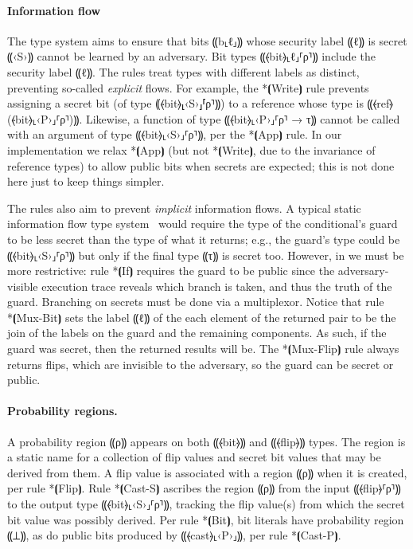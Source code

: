 \paragraph*{Information flow}
%
The type system aims to ensure that bits ⸨b⸤ℓ⸥⸩ whose security label
⸨ℓ⸩ is secret ⸨‹S›⸩ cannot be learned by an adversary. Bit types
⸨⦑bit⦒⸤ℓ⸥⸢ρ⸣⸩ include the security label ⸨ℓ⸩. The rules treat types
with different labels as distinct, preventing so-called \emph{explicit} flows. For
example, the *⦗Write⦘ rule prevents assigning a secret bit (of type
⸨⦑bit⦒⸤‹S›⸥⸢ρ⸣⸩) to a reference whose type is
⸨⦑ref⦒(⦑bit⦒⸤‹P›⸥⸢ρ⸣)⸩. Likewise, a function of type ⸨⦑bit⦒⸤‹P›⸥⸢ρ⸣ →
τ⸩ cannot be called with an argument of type ⸨⦑bit⦒⸤‹S›⸥⸢ρ⸣⸩, per the
*⦗App⦘ rule. In our implementation we relax *⦗App⦘ (but not *⦗Write⦘, due to
the invariance of reference types) to allow public bits
when secrets are expected; this is not done here just to keep things simpler.

The rules also aim to prevent \emph{implicit} information flows. A
typical static information flow type system~\cite{infoflow} would
require the type of the conditional's guard
to be less secret than the type of what it returns; e.g., the guard's
type could be ⸨⦑bit⦒⸤‹S›⸥⸢ρ⸣⸩ but only if the final type ⸨τ⸩ is secret
too. However, in \obliv we must be more restrictive: rule *⦗If⦘
requires the guard to be public since the
adversary-visible execution trace reveals which branch is taken, and
thus the truth of the guard. Branching on secrets must be done via
a multiplexor. Notice that rule *⦗Mux-Bit⦘ sets the label ⸨ℓ⸩ of the
each element of the returned pair to be the join of the labels on the
guard and the remaining components. As such, if the guard was secret,
then the returned results will be.  The *⦗Mux-Flip⦘ rule
always returns flips, which are invisible to the adversary, so the
guard can be secret or public.

\paragraph*{Probability regions.}
%
A probability region ⸨ρ⸩ appears on both ⸨⦑bit⦒⸩ and ⸨⦑flip⦒⸩
types. The region is a static name for a collection of flip values and
secret bit values that may be derived from them. A flip value is
associated with a region ⸨ρ⸩ when it is created, per rule *⦗Flip⦘. Rule
*⦗Cast-S⦘ ascribes the region ⸨ρ⸩ from the input ⸨⦑flip⦒⸢ρ⸣⸩ to the
output type ⸨⦑bit⦒⸤‹S›⸥⸢ρ⸣⸩, tracking the flip value(s) from which the
secret bit value was possibly derived. Per rule *⦗Bit⦘, bit literals
have probability region ⸨⊥⸩, as do public bits produced by
⸨⦑cast⦒⸤‹P›⸥⸩, per rule *⦗Cast-P⦘.

